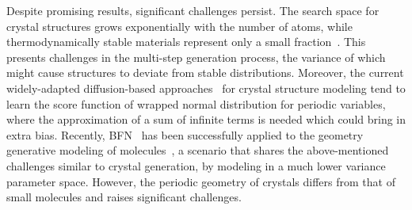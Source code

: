 

Despite promising results, significant challenges persist. The search space for crystal structures grows exponentially with the number of atoms, while thermodynamically stable materials represent only a small fraction~\citep{flowmm}. This presents challenges in the multi-step generation process, the variance of which might cause structures to deviate from stable distributions. Moreover, the current widely-adapted diffusion-based approaches~\citep{jiao2023crystal,jiao2024space} for crystal structure modeling tend to learn the score function of wrapped normal distribution for periodic variables, where the approximation of a sum of infinite terms is needed which could bring in extra bias. Recently, BFN~\citep{bfn} has been successfully applied to the geometry generative modeling of molecules~\citep{song2023unified}, a scenario that shares the above-mentioned challenges similar to crystal generation, by modeling in a much lower variance parameter space. However, the periodic geometry of crystals differs from that of small molecules and raises significant challenges.



